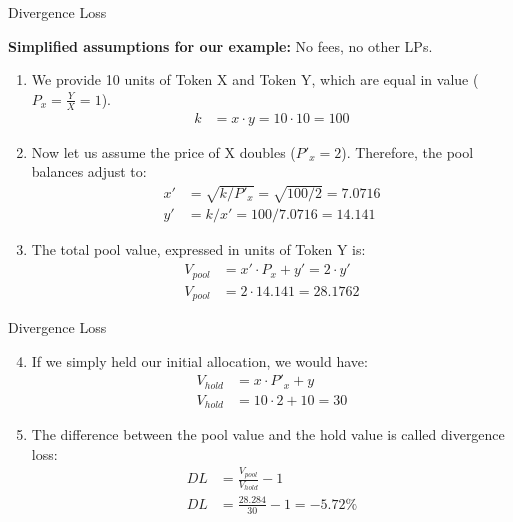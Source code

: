 \documentclass[handout]{beamer}
\begin{document}
\begin{frame}{Divergence Loss}

	\textbf{Simplified assumptions for our example:} No fees, no other LPs. \\ 
		\begin{enumerate}
			\item<2-> We provide 10 units of Token X and Token Y, which are equal in value ($P_x = \tfrac{Y}{X} = 1$).
				\begin{align*}
					k &= x \cdot y = 10 \cdot 10 = 100	
				\end{align*}
			\item<3-> Now let us assume the price of X doubles ($P'_x = 2$). Therefore, the pool balances adjust to:
				\begin{align*}
					x' &= \sqrt{k/P'_{x}}	 = \sqrt{100/2} = 7.0716\\
					y' &= k / x' = 100 / 7.0716 = 14.141
				\end{align*}
			\item<4-> The total pool value, expressed in units of Token Y is: 
				\begin{align*}
					V_{pool} &= x' \cdot P_x + y' = 2 \cdot y'\\
					V_{pool} &= 2 \cdot 14.141 = 28.1762
				\end{align*}
		\end{enumerate}	
\end{frame}


\begin{frame}{Divergence Loss}

	\begin{enumerate}
	\setcounter{enumi}{3}
		\item<1-> If we simply held our initial allocation, we would have:
			\begin{align*}
				V_{hold} &= x \cdot P'_x + y\\
				V_{hold} &= 10 \cdot 2 + 10 = 30
			\end{align*}
		\item<2-> The difference between the pool value and the hold value is called divergence loss:
			\begin{align*}
				DL &= \tfrac{V_{pool}}{V_{hold}} - 1\\
				DL &= \tfrac{28.284}{30} - 1 = -5.72 \%
			\end{align*}
	\end{enumerate}	
	
	
\end{frame}
\end{document}
